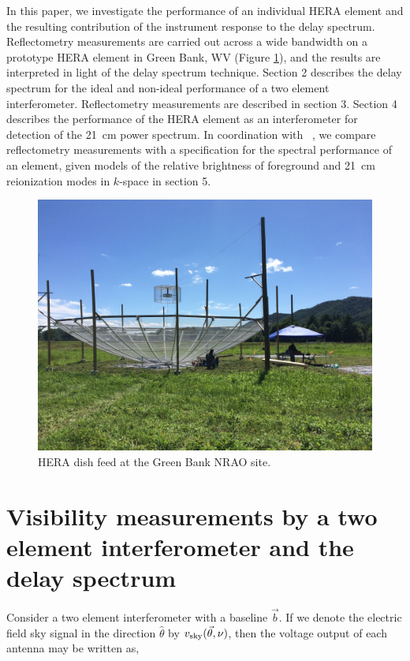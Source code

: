 \documentclass[twocolumn]{emulateapj}
\newcommand{\volt}{{v}}
\newcommand{\sky}{{\rm sky}}
\newcommand{\thhat}{{\hat\theta}}
\begin{document}
In this paper, we investigate the performance of an individual HERA element and the resulting contribution of the instrument response to the delay spectrum.
 Reflectometry measurements  are carried out across a wide bandwidth on a prototype HERA element in Green Bank, WV (Figure \ref{fig:heradish}), and the results are interpreted in light of the delay spectrum technique. Section 2 describes the delay spectrum for the ideal and non-ideal performance of a two element interferometer. Reflectometry measurements are described in section 3. Section 4 describes the performance of the HERA element as an interferometer for detection of the 21~cm power spectrum.
In coordination with ~\citet{XXXsisterpapers}, we compare 
reflectometry measurements with
a specification for the spectral performance of an element, given models of the relative brightness of
foreground and 21~cm reionization modes in $k$-space in section 5.

\begin{figure}
\centering
\includegraphics[trim={2cm 20cm 30cm 15cm},clip, totalheight=0.3\textheight]{plots/heradish.jpg}
\caption{HERA dish feed at the Green Bank NRAO site.}
\label{fig:heradish}
\end{figure}


\section{\textbf{Visibility measurements by a two element interferometer and the delay spectrum}}
Consider a two element interferometer with a baseline $\vec b$. If we denote the electric field sky signal in the direction $\thhat$ by $\volt_\sky(\vec \theta, \nu)$, then the voltage output of each antenna may be written as,  
\end{document}
